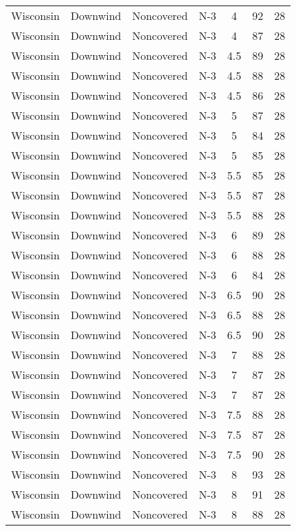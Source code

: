 \documentclass{article}
\begin{document}
\begin{longtable}[H]{ccccccc}
Wisconsin & Downwind & Noncovered & N-3 & 4    & 92  & 28 \\
Wisconsin & Downwind & Noncovered & N-3 & 4    & 87  & 28 \\
Wisconsin & Downwind & Noncovered & N-3 & 4.5  & 89  & 28 \\
Wisconsin & Downwind & Noncovered & N-3 & 4.5  & 88  & 28 \\
Wisconsin & Downwind & Noncovered & N-3 & 4.5  & 86  & 28 \\
Wisconsin & Downwind & Noncovered & N-3 & 5    & 87  & 28 \\
Wisconsin & Downwind & Noncovered & N-3 & 5    & 84  & 28 \\
Wisconsin & Downwind & Noncovered & N-3 & 5    & 85  & 28 \\
Wisconsin & Downwind & Noncovered & N-3 & 5.5  & 85  & 28 \\
Wisconsin & Downwind & Noncovered & N-3 & 5.5  & 87  & 28 \\
Wisconsin & Downwind & Noncovered & N-3 & 5.5  & 88  & 28 \\
Wisconsin & Downwind & Noncovered & N-3 & 6    & 89  & 28 \\
Wisconsin & Downwind & Noncovered & N-3 & 6    & 88  & 28 \\
Wisconsin & Downwind & Noncovered & N-3 & 6    & 84  & 28 \\
Wisconsin & Downwind & Noncovered & N-3 & 6.5  & 90  & 28 \\
Wisconsin & Downwind & Noncovered & N-3 & 6.5  & 88  & 28 \\
Wisconsin & Downwind & Noncovered & N-3 & 6.5  & 90  & 28 \\
Wisconsin & Downwind & Noncovered & N-3 & 7    & 88  & 28 \\
Wisconsin & Downwind & Noncovered & N-3 & 7    & 87  & 28 \\
Wisconsin & Downwind & Noncovered & N-3 & 7    & 87  & 28 \\
Wisconsin & Downwind & Noncovered & N-3 & 7.5  & 88  & 28 \\
Wisconsin & Downwind & Noncovered & N-3 & 7.5  & 87  & 28 \\
Wisconsin & Downwind & Noncovered & N-3 & 7.5  & 90  & 28 \\
Wisconsin & Downwind & Noncovered & N-3 & 8    & 93  & 28 \\
Wisconsin & Downwind & Noncovered & N-3 & 8    & 91  & 28 \\
Wisconsin & Downwind & Noncovered & N-3 & 8    & 88  & 28 \\

\end{longtable}
\end{document}
